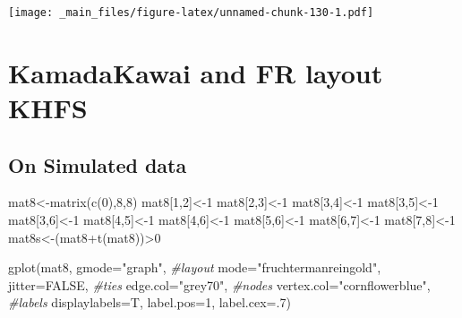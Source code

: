 \documentclass[
  notitlepage,
  onecolumn,
  openany]{book}
\newenvironment{Shaded}{\begin{snugshade}}{\end{snugshade}}
\newcommand{\AttributeTok}[1]{\textcolor[rgb]{0.77,0.63,0.00}{#1}}
\newcommand{\CommentTok}[1]{\textcolor[rgb]{0.56,0.35,0.01}{\textit{#1}}}
\newcommand{\ConstantTok}[1]{\textcolor[rgb]{0.00,0.00,0.00}{#1}}
\newcommand{\DecValTok}[1]{\textcolor[rgb]{0.00,0.00,0.81}{#1}}
\newcommand{\FunctionTok}[1]{\textcolor[rgb]{0.00,0.00,0.00}{#1}}
\newcommand{\NormalTok}[1]{#1}
\newcommand{\OtherTok}[1]{\textcolor[rgb]{0.56,0.35,0.01}{#1}}
\newcommand{\SpecialCharTok}[1]{\textcolor[rgb]{0.00,0.00,0.00}{#1}}
\newcommand{\StringTok}[1]{\textcolor[rgb]{0.31,0.60,0.02}{#1}}
\begin{document}
\texttt{[image: \_main\_files/figure-latex/unnamed-chunk-130-1.pdf]}

\hypertarget{kamadakawai-and-fr-layout-khfs}{%
\section{KamadaKawai and FR layout KHFS}\label{kamadakawai-and-fr-layout-khfs}}

\hypertarget{on-simulated-data}{%
\subsection{On Simulated data}\label{on-simulated-data}}

\begin{Shaded}
\begin{Highlighting}[]
\NormalTok{mat8}\OtherTok{\textless{}{-}}\FunctionTok{matrix}\NormalTok{(}\FunctionTok{c}\NormalTok{(}\DecValTok{0}\NormalTok{),}\DecValTok{8}\NormalTok{,}\DecValTok{8}\NormalTok{)}
\NormalTok{mat8[}\DecValTok{1}\NormalTok{,}\DecValTok{2}\NormalTok{]}\OtherTok{\textless{}{-}}\DecValTok{1}
\NormalTok{mat8[}\DecValTok{2}\NormalTok{,}\DecValTok{3}\NormalTok{]}\OtherTok{\textless{}{-}}\DecValTok{1}
\NormalTok{mat8[}\DecValTok{3}\NormalTok{,}\DecValTok{4}\NormalTok{]}\OtherTok{\textless{}{-}}\DecValTok{1}
\NormalTok{mat8[}\DecValTok{3}\NormalTok{,}\DecValTok{5}\NormalTok{]}\OtherTok{\textless{}{-}}\DecValTok{1}
\NormalTok{mat8[}\DecValTok{3}\NormalTok{,}\DecValTok{6}\NormalTok{]}\OtherTok{\textless{}{-}}\DecValTok{1}
\NormalTok{mat8[}\DecValTok{4}\NormalTok{,}\DecValTok{5}\NormalTok{]}\OtherTok{\textless{}{-}}\DecValTok{1}
\NormalTok{mat8[}\DecValTok{4}\NormalTok{,}\DecValTok{6}\NormalTok{]}\OtherTok{\textless{}{-}}\DecValTok{1}
\NormalTok{mat8[}\DecValTok{5}\NormalTok{,}\DecValTok{6}\NormalTok{]}\OtherTok{\textless{}{-}}\DecValTok{1}
\NormalTok{mat8[}\DecValTok{6}\NormalTok{,}\DecValTok{7}\NormalTok{]}\OtherTok{\textless{}{-}}\DecValTok{1}
\NormalTok{mat8[}\DecValTok{7}\NormalTok{,}\DecValTok{8}\NormalTok{]}\OtherTok{\textless{}{-}}\DecValTok{1}
\NormalTok{mat8s}\OtherTok{\textless{}{-}}\NormalTok{(mat8}\SpecialCharTok{+}\FunctionTok{t}\NormalTok{(mat8))}\SpecialCharTok{\textgreater{}}\DecValTok{0}

\FunctionTok{gplot}\NormalTok{(mat8, }
      \AttributeTok{gmode=}\StringTok{"graph"}\NormalTok{,}
      \CommentTok{\#layout}
      \AttributeTok{mode=}\StringTok{"fruchtermanreingold"}\NormalTok{,}
      \AttributeTok{jitter=}\ConstantTok{FALSE}\NormalTok{,}
      \CommentTok{\#ties}
      \AttributeTok{edge.col=}\StringTok{"grey70"}\NormalTok{,}
      \CommentTok{\#nodes}
      \AttributeTok{vertex.col=}\StringTok{"cornflowerblue"}\NormalTok{,}
      \CommentTok{\#labels}
      \AttributeTok{displaylabels=}\NormalTok{T,}
      \AttributeTok{label.pos=}\DecValTok{1}\NormalTok{,}
      \AttributeTok{label.cex=}\NormalTok{.}\DecValTok{7}\NormalTok{)}
\end{Highlighting}
\end{Shaded}
\end{document}
